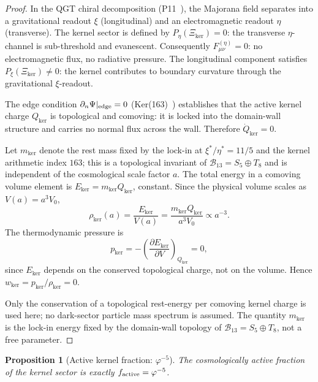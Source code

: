 \documentclass[twocolumn,10pt]{article}
\newcommand{\vp}{\varphi}
\newcommand{\Bone}{\mathcal{B}_{13}}
\newtheorem{proposition}[theorem]{Proposition}
\begin{document}
\begin{proof}
In the QGT chiral decomposition (P11~\cite{CamP11}), the Majorana
field separates into a gravitational readout $\xi$ (longitudinal)
and an electromagnetic readout $\eta$ (transverse).
The kernel sector is defined by $P_\eta(\Xi_{\ker})=0$: the
transverse $\eta$-channel is sub-threshold and evanescent.
Consequently $F_{\mu\nu}^{(\eta)}=0$: no electromagnetic flux,
no radiative pressure. The longitudinal component satisfies
$P_\xi(\Xi_{\ker})\neq0$: the kernel contributes to boundary
curvature through the gravitational $\xi$-readout.

The edge condition $\partial_n\Psi|_{\rm edge}=0$ (Ker(163)~\cite{CamKer163})
establishes that the active kernel charge $Q_{\ker}$ is topological
and comoving: it is locked into the domain-wall structure and
carries no normal flux across the wall. Therefore $\dot Q_{\ker}=0$.

Let $m_{\ker}$ denote the rest mass fixed by the lock-in at
$\xi^*/\eta^*=11/5$ and the kernel arithmetic index $163$;
this is a topological invariant of $\Bone=S_5\oplus T_8$ and is
independent of the cosmological scale factor $a$.
The total energy in a comoving volume element is
$E_{\ker}=m_{\ker}Q_{\ker}$, constant. Since the physical volume
scales as $V(a)=a^3 V_0$,
\begin{equation*}
  \rho_{\ker}(a)=\frac{E_{\ker}}{V(a)}=\frac{m_{\ker}Q_{\ker}}{a^3 V_0}
  \propto a^{-3}.
\end{equation*}
The thermodynamic pressure is
\begin{equation*}
  p_{\ker}
  =-\!\left(\frac{\partial E_{\ker}}{\partial V}\right)_{\!Q_{\ker}}=0,
\end{equation*}
since $E_{\ker}$ depends on the conserved topological charge, not
on the volume. Hence $w_{\ker}=p_{\ker}/\rho_{\ker}=0$.

Only the conservation of a topological rest-energy per comoving
kernel charge is used here; no dark-sector particle mass spectrum
is assumed. The quantity $m_{\ker}$ is the lock-in energy fixed by
the domain-wall topology of $\Bone=S_5\oplus T_8$, not a free
parameter.
\end{proof}

\begin{proposition}[Active kernel fraction: $\vp^{-5}$]
\label{lem:frac}
The cosmologically active fraction of the kernel sector is exactly
$f_{\rm active}=\vp^{-5}$.
\end{proposition}
\end{document}
